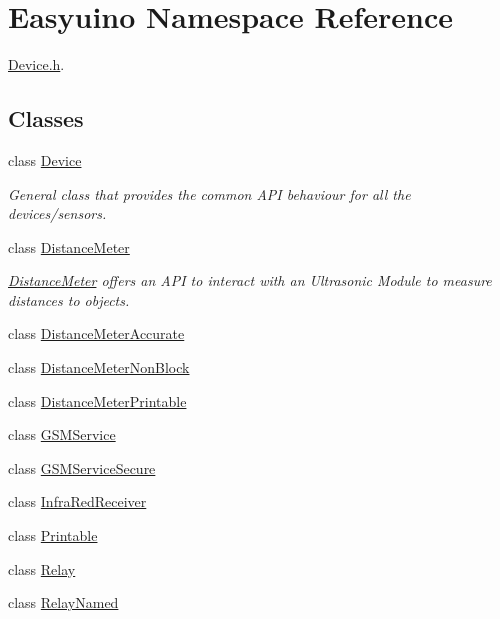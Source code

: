 \hypertarget{namespace_easyuino}{}\section{Easyuino Namespace Reference}
\label{namespace_easyuino}


\hyperlink{_device_8h_source}{Device.\+h}.  


\subsection*{Classes}
\begin{DoxyCompactItemize}
\item 
class \hyperlink{class_easyuino_1_1_device}{Device}
\begin{DoxyCompactList}\small\item\em General class that provides the common A\+PI behaviour for all the devices/sensors. \end{DoxyCompactList}\item 
class \hyperlink{class_easyuino_1_1_distance_meter}{Distance\+Meter}
\begin{DoxyCompactList}\small\item\em \hyperlink{class_easyuino_1_1_distance_meter}{Distance\+Meter} offers an A\+PI to interact with an Ultrasonic Module to measure distances to objects. \end{DoxyCompactList}\item 
class \hyperlink{class_easyuino_1_1_distance_meter_accurate}{Distance\+Meter\+Accurate}
\item 
class \hyperlink{class_easyuino_1_1_distance_meter_non_block}{Distance\+Meter\+Non\+Block}
\item 
class \hyperlink{class_easyuino_1_1_distance_meter_printable}{Distance\+Meter\+Printable}
\item 
class \hyperlink{class_easyuino_1_1_g_s_m_service}{G\+S\+M\+Service}
\item 
class \hyperlink{class_easyuino_1_1_g_s_m_service_secure}{G\+S\+M\+Service\+Secure}
\item 
class \hyperlink{class_easyuino_1_1_infra_red_receiver}{Infra\+Red\+Receiver}
\item 
class \hyperlink{class_easyuino_1_1_printable}{Printable}
\item 
class \hyperlink{class_easyuino_1_1_relay}{Relay}
\item 
class \hyperlink{class_easyuino_1_1_relay_named}{Relay\+Named}
\item 

\end{DoxyCompactItemize}
